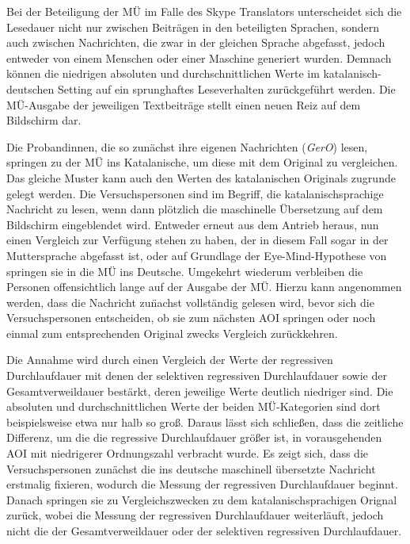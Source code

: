 Bei der Beteiligung der MÜ im Falle des Skype Translators unterscheidet sich die Lesedauer nicht nur zwischen Beiträgen in den beteiligten Sprachen, sondern auch zwischen Nachrichten, die zwar in der gleichen Sprache abgefasst, jedoch entweder von einem Menschen oder einer Maschine generiert wurden. Demnach können die niedrigen absoluten und durchschnittlichen Werte im katalanisch-deutschen Setting auf ein sprunghaftes Leseverhalten zurückgeführt werden. Die MÜ-Ausgabe der jeweiligen Textbeiträge stellt einen neuen Reiz auf dem Bildschirm dar. 

Die Proband{\textperiodcentered}innen, die so zunächst ihre eigenen Nachrichten (\emph{GerO}) lesen, springen zu der MÜ ins Katalanische, um diese mit dem Original zu vergleichen. Das gleiche Muster kann auch den Werten des katalanischen Originals zugrunde gelegt werden. Die Versuchspersonen sind im Begriff, die katalanischsprachige Nachricht zu lesen, wenn dann plötzlich die maschinelle Übersetzung auf dem Bildschirm eingeblendet wird. Entweder erneut aus dem Antrieb heraus, nun einen Vergleich zur Verfügung stehen zu haben, der in diesem Fall sogar in der Muttersprache abgefasst ist, oder auf Grundlage der Eye-Mind-Hypothese von \citet{just_theory_1980} springen sie in die MÜ ins Deutsche. Umgekehrt wiederum verbleiben die Personen offensichtlich lange auf der Ausgabe der MÜ. Hierzu kann angenommen werden, dass die Nachricht zu\"nachst vollständig gelesen wird, bevor sich die Versuchspersonen entscheiden, ob sie zum nächsten AOI springen oder noch einmal zum entsprechenden Original zwecks Vergleich zurückkehren.

Die Annahme wird durch einen Vergleich der Werte der regressiven Durchlaufdauer mit denen der selektiven regressiven Durchlaufdauer sowie der Gesamtverweildauer bestärkt, deren jeweilige Werte deutlich niedriger sind. Die absoluten und durchschnittlichen Werte der beiden MÜ-Kategorien sind dort beispielsweise etwa nur halb so groß. Daraus lässt sich schließen, dass die zeitliche Differenz, um die die regressive Durchlaufdauer größer ist, in vorausgehenden AOI mit niedrigerer Ordnungszahl verbracht wurde. Es zeigt sich, dass die Versuchspersonen zunächst die ins deutsche maschinell übersetzte Nachricht erstmalig fixieren, wodurch die Messung der regressiven Durchlaufdauer beginnt. Danach springen sie zu Vergleichszwecken zu dem katalanischsprachigen Orignal zurück, wobei die Messung der regressiven Durchlaufdauer weiterläuft, jedoch nicht die der Gesamtverweildauer oder der selektiven regressiven Durchlaufdauer.

